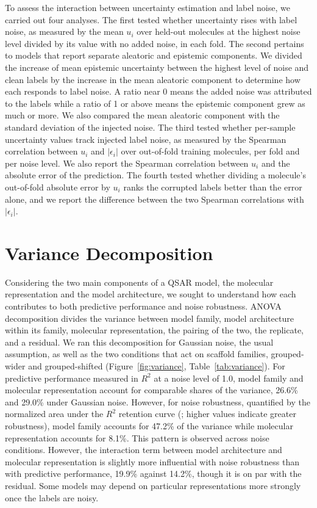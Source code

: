 To assess the interaction between uncertainty estimation and label noise, we carried out four analyses. The first tested whether uncertainty rises with label noise, as measured by the mean $u_i$ over held-out molecules at the highest noise level
divided by its value with no added noise, in each fold. The second pertains to models that report separate aleatoric and epistemic components. We divided the increase of mean epistemic uncertainty between the highest level of noise and clean labels by the increase in the mean aleatoric component to determine how each responds to label noise. A ratio near 0 means the added noise was attributed to the labels while a ratio of 1 or above means the epistemic component grew as much or more. We also compared the mean aleatoric component with the standard deviation of the injected noise. The third tested whether per-sample uncertainty values track injected label noise, as measured by the Spearman correlation between $u_i$ and $|\epsilon_i|$ over out-of-fold training molecules, per fold and per noise level. We also report the Spearman correlation between $u_i$ and the absolute error of the prediction. The fourth tested whether dividing a molecule's out-of-fold absolute error by $u_i$ ranks the corrupted labels better than the error alone, and we report the difference between the two Spearman correlations with $|\epsilon_i|$.


\section{Variance Decomposition}

Considering the two main components of a QSAR model, the molecular representation and the model architecture, we sought to understand how each contributes to both predictive performance and noise robustness. ANOVA decomposition divides the variance between model family, model architecture within its family, molecular representation, the pairing of the two, the replicate, and a residual. We ran this decomposition for Gaussian noise, the usual assumption, as well as the two conditions that act on scaffold families, grouped-wider and grouped-shifted (Figure~\ref{fig:variance}, Table~\ref{tab:variance}). For predictive performance measured in $R^2$ at a noise level of 1.0, model family and molecular representation account for comparable shares of the variance, 26.6\% and 29.0\% under Gaussian noise. However, for noise robustness, quantified by the normalized area under the $R^2$ retention curve (\aucnorm; higher values indicate greater robustness), model family accounts for 47.2\% of the variance while molecular representation accounts for 8.1\%. This pattern is observed across noise conditions. However, the interaction term between model architecture and molecular representation is slightly more influential with noise robustness than with predictive performance, 19.9\% against 14.2\%, though it is on par with the residual. Some models may depend on particular representations more strongly once the labels are noisy.

